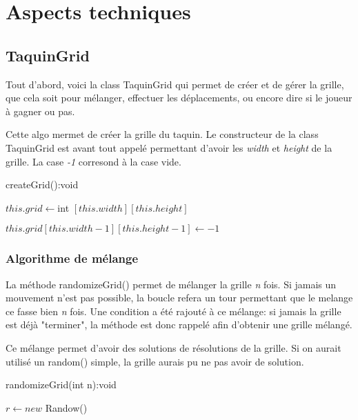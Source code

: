 \chapter{Aspects techniques}

	\section{TaquinGrid}

		Tout d'abord, voici la class TaquinGrid qui permet de créer et de gérer la grille, que cela soit pour mélanger, effectuer les déplacements, ou encore dire si le joueur à gagner ou pas.

		Cette algo mermet de créer la grille du taquin. Le constructeur de la class TaquinGrid est avant tout appelé permettant d'avoir les \textit{width} et \textit{height} de la grille. La case \textit{-1} corresond à la case vide.

		\begin{algorithm}[H]
			\caption{createGrid():void}
			$this.grid \leftarrow $int $[this.width][this.height]$


			$this.grid[this.width-1][this.height-1] \leftarrow -1$
		\end{algorithm}

		\subsection{Algorithme de mélange}
			La méthode randomizeGrid() permet de mélanger la grille \textit{n} fois. Si jamais un mouvement n'est pas possible, la boucle refera un tour permettant que le melange ce fasse bien \textit{n} fois. Une condition a été rajouté à ce mélange: si jamais la grille est déjà "terminer", la méthode est donc rappelé afin d'obtenir une grille mélangé.

			Ce mélange permet d'avoir des solutions de résolutions de la grille. Si on aurait utilisé un random() simple, la grille aurais pu ne pas avoir de solution.\\

			\begin{algorithm}[H]
				\caption{randomizeGrid(int n):void}
				$r\leftarrow new$ Randow()


			\end{algorithm}

